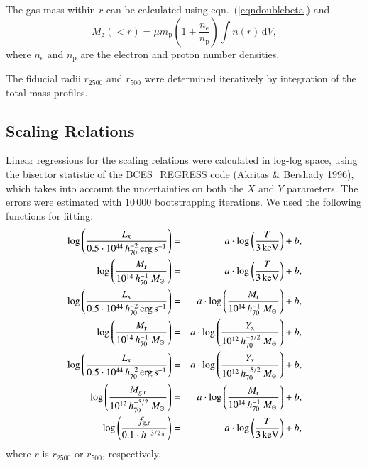\documentclass[structabstract]{aa}
\begin{document}
The gas mass within $r$ can be calculated using eqn.\ (\ref{eqndoublebeta}) and
\begin{equation} \label{eqndoublegasmass}
 M_{\text{g}}(<r)= \mu m_{\text{p}} \left( 1+\frac{n_{\text{e}}}{n_{\text{p}}}\right) \int n(r)\, \text{d}V,
\end{equation}
where $n_{\text{e}}$ and $n_{\text{p}}$ are the electron and proton number densities.

The fiducial radii $r_{2500}$ and $r_{500}$ were determined
iteratively by integration of the total mass profiles.

%
\subsection{Scaling Relations}\label{sec:scaling}
Linear regressions for the scaling relations were calculated in
log-log space, using the bisector statistic of the \url{BCES_REGRESS}
code (Akritas \& Bershady 1996), which takes into account the
uncertainties on both the $X$ and $Y$ parameters. The errors were
estimated with $10\,000$ bootstrapping iterations. We used the
following functions for fitting:
\begin{eqnarray}
\log\left(\frac{L_{\text{x}}}{0.5\cdot\unit[10^{44}\,h^{-2}_{70}]{erg\,s^{-1}}}\right)&=&a \cdot \log\left(\frac{T}{\unit[3]{keV}}\right)+b,\\
\log\left(\frac{M_{\text{r}}}{\unit[10^{14}\,h^{-1}_{70}~M_{\odot}]{}}\right)&=&a \cdot \log\left(\frac{T}{\unit[3]{keV}}\right)+b,\\
\log\left(\frac{L_{\text{x}}}{0.5\cdot\unit[10^{44}\,h^{-2}_{70}]{erg\,s^{-1}}}\right)&=&a\cdot\log\left(\frac{M_{\text{r}}}{\unit[10^{14}\,h^{-1}_{70}~M_{\odot}]{}}\right)+b,\\
\log\left(\frac{M_{\text{r}}}{\unit[10^{14}\,h^{-1}_{70}~M_{\odot}]{}}\right)&=&a \cdot \log\left(\frac{Y_{\text{x}}}{\unit[10^{12}\,h^{-5/2}_{70}~M_{\odot}]{}}\right)+b,\\
\log\left(\frac{L_{\text{x}}}{0.5\cdot\unit[10^{44}\,h^{-2}_{70}]{erg\,s^{-1}}}\right)&=&a \cdot \log\left(\frac{Y_{\text{x}}}{\unit[10^{12}\,h^{-5/2}_{70}~M_{\odot}]{}}\right)+b,\\
\log\left(\frac{M_{\text{g,r}}}{\unit[10^{12}\,h^{-5/2}_{70}~M_{\odot}]{}}\right)&=&a\cdot\log\left(\frac{M_{\text{r}}}{\unit[10^{14}\,h^{-1}_{70}~M_{\odot}]{}}\right)+b,\\
\log\left(\frac{f_{\text{g,r}}}{0.1\cdot h^{-3/2_{70}}}\right)&=&a \cdot\log\left(\frac{T}{\unit[3]{keV}}\right)+b,
\end{eqnarray}
where $r$ is $r_{2500}$ or $r_{500}$, respectively.
\end{document}
